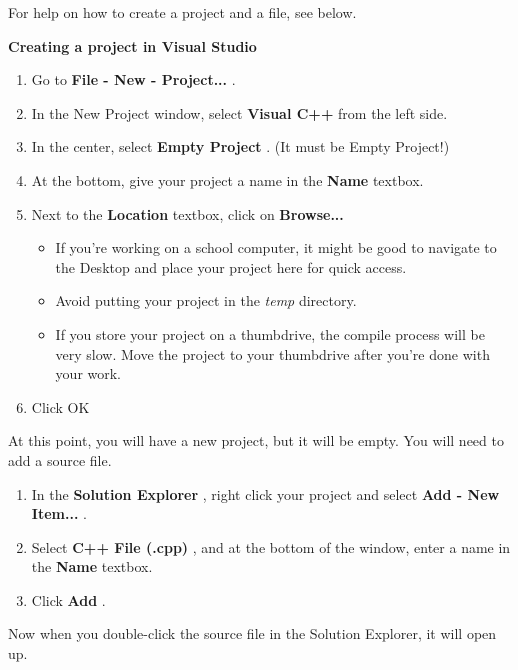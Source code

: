 \documentclass[a4paper,12pt]{book}
\begin{document}
                For help on how to create a project and a file, see below.

                
            
\begin{mdframed}[backgroundcolor=intro] 
\textbf{ Creating a project in Visual Studio } ~\\

\begin{enumerate}
    \item Go to \textbf{ File - New - Project... }.
    \item In the New Project window, select \textbf{ Visual C++ } from the left side.
    \item In the center, select \textbf{ Empty Project }. (It must be Empty Project!)
    \item At the bottom, give your project a name in the \textbf{ Name } textbox.
    \item Next to the \textbf{ Location } textbox, click on \textbf{ Browse... }
    \begin{itemize}
        \item If you're working on a school computer, it might be good to
        navigate to the Desktop and place your project here for quick access.
        \item Avoid putting your project in the \textit{ temp } directory.
        \item If you store your project on a thumbdrive, the compile process
        will be very slow. Move the project to your thumbdrive after you're done
        with your work.
    \end{itemize}
    \item Click OK
\end{enumerate}

At this point, you will have a new project, but it will be empty. You will need to add a source file.

\begin{enumerate}
    \item In the \textbf{ Solution Explorer }, right click your project and select
        \textbf{ Add - New Item... }.
    \item Select \textbf{ C++ File (.cpp) }, and at the bottom of the window,
        enter a name in the \textbf{ Name } textbox.
    \item Click \textbf{ Add }.
\end{enumerate}

Now when you double-click the source file in the Solution Explorer, it will open up.

\end{mdframed}
\end{document}

